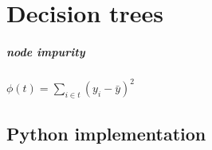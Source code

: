 \chapter{Decision trees}

\paragraph{node impurity} $\phi(t) = \sum_{i\in t}(y_i-\bar{y})^2$

\section{Python implementation}

\inputminted{python}{code/machine-learning/decision-trees/decision-tree.py}